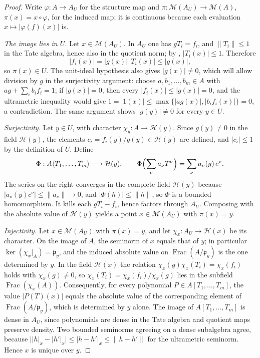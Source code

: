 \begin{proof}
Write $\varphi:A\to A_U$ for the structure map and
$\pi:\mathcal M(A_U)\to\mathcal M(A)$, $\pi(x)=x\circ\varphi$, for
the induced map; it is continuous because each evaluation
$x\mapsto|\varphi(f)(x)|$ is.

\emph{The image lies in $U$.}
Let $x\in\mathcal M(A_U)$.  In $A_U$ one has $gT_i=f_i$, and
$\|T_i\|\leq1$ in the Tate algebra, hence also in the quotient norm; by
, $|T_i(x)|\leq1$.  Therefore
\[
 |f_i(x)|=|g(x)|\,|T_i(x)|\leq|g(x)|,
\]
so $\pi(x)\in U$. The unit-ideal hypothesis also gives $|g(x)|\neq0$,
which will allow division by $g$ in the surjectivity argument:
choose $a,b_1,\ldots,b_m\in A$ with $ag+\sum_ib_if_i=1$; if
$|g(x)|=0$, then every $|f_i(x)|\leq|g(x)|=0$, and the ultrametric
inequality would give $1=|1(x)|\leq\max\{|ag(x)|,|b_if_i(x)|\}=0$, a
contradiction.  The same argument shows $|g(y)|\neq0$ for every
$y\in U$.

\emph{Surjectivity.}
Let $y\in U$, with character $\chi_y:A\to\mathcal H(y)$.  Since
$g(y)\neq0$ in the field $\mathcal H(y)$, the elements
$c_i=f_i(y)/g(y)\in\mathcal H(y)$ are defined, and $|c_i|\leq1$ by the
definition of $U$.  Define
\[
 \Phi:A\langle T_1,\ldots,T_m\rangle\longrightarrow\mathcal H(y),
 \qquad
 \Phi\Bigl(\sum_\nu a_\nu T^\nu\Bigr)=\sum_\nu a_\nu(y)\,c^\nu.
\]
The series on the right converges in the complete field
$\mathcal H(y)$ because $|a_\nu(y)c^\nu|\leq\|a_\nu\|\to0$, and
$|\Phi(h)|\leq\|h\|$, so $\Phi$ is a bounded homomorphism.  It kills
each $gT_i-f_i$, hence factors through $A_U$.  Composing with the
absolute value of $\mathcal H(y)$ yields a point
$x\in\mathcal M(A_U)$ with $\pi(x)=y$.

\emph{Injectivity.}
Let $x\in\mathcal M(A_U)$ with $\pi(x)=y$, and let
$\chi_x:A_U\to\mathcal H(x)$ be its character.  On the image of $A$,
the seminorm of $x$ equals that of $y$; in particular
$\ker(\chi_x|_A)=\mathfrak p_y$, and the induced absolute value on
$\operatorname{Frac}(A/\mathfrak p_y)$ is the one determined by $y$.
In the field $\mathcal H(x)$ the relation
$\chi_x(g)\chi_x(T_i)=\chi_x(f_i)$ holds with $\chi_x(g)\neq0$, so
$\chi_x(T_i)=\chi_x(f_i)/\chi_x(g)$ lies in the subfield
$\operatorname{Frac}(\chi_x(A))$.  Consequently, for every polynomial
$P\in A[T_1,\ldots,T_m]$, the value $|P(T)(x)|$ equals the absolute
value of the corresponding element of
$\operatorname{Frac}(A/\mathfrak p_y)$, which is determined by $y$
alone.  The image of $A[T_1,\ldots,T_m]$ is dense in $A_U$, since
polynomials are dense in the Tate algebra and quotient maps preserve
density.  Two bounded seminorms agreeing on a dense subalgebra agree,
because
$\bigl||h|_x-|h'|_x\bigr|\leq|h-h'|_x\leq\|h-h'\|$ for the ultrametric
seminorm.  Hence $x$ is unique over $y$.


\end{proof}
